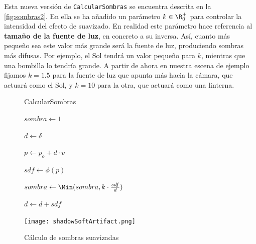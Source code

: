 Esta nueva versión de \texttt{CalcularSombras} se encuentra descrita en la \autoref{fig:sombras2}. En ella se ha añadido un parámetro $k\in \R_0^+$ para controlar la intensidad del efecto de suavizado. En realidad este parámetro hace referencia al \textbf{tamaño de la fuente de luz}, en concreto a su inversa. Así, cuanto más pequeño sea este valor más grande será la fuente de luz, produciendo sombras más difusas. Por ejemplo, el Sol tendrá un valor pequeño para $k$, mientras que una bombilla lo tendría grande. A partir de ahora en nuestra escena de ejemplo fijamos $k=  1.5$ para la fuente de luz que apunta más hacia la cámara, que actuará como el Sol, y $k = 10$ para la otra, que actuará como una linterna.\newline

\begin{figure}[ht!]
    \centering
    \begin{minipage}{0.50\textwidth}
       \begin{algorithm}[H]
            \caption{CalcularSombras}
                $sombra \gets 1$
                
                $d \gets \delta$ 
                
                 {
                    $p \gets p_o + d \cdot v$
                    
                    $sdf \gets \phi(p)$
                    
                    $sombra \gets \Min(sombra, k\cdot \frac{sdf}{d})$
                    
                    $d \gets d + sdf$

                }

        \end{algorithm}
    \end{minipage}%
    \hfill
    \begin{minipage}{0.48\textwidth}
        \texttt{[image: shadowSoftArtifact.png]}
    \end{minipage}
    \caption{Cálculo de sombras suavizadas}
    \label{fig:sombras2}
\end{figure}

